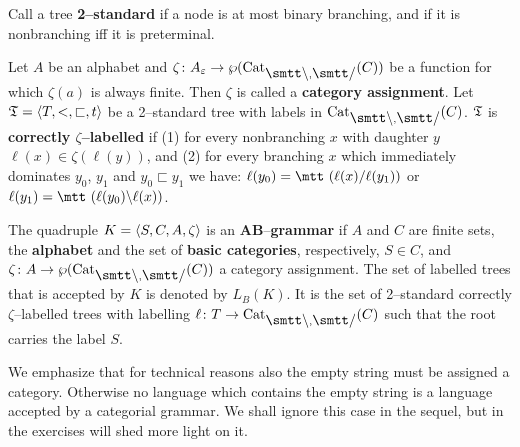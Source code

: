 Call a tree \textbf{2--standard} if a node is at most binary branching,
and if it is nonbranching iff it is preterminal.
\begin{defn}
Let $A$ be an alphabet and $\zeta \colon A_{\varepsilon} \pf
\wp(\Cat_{\mbox{\smtt\tb}, \mbox{\smtt\tf}}(C))$ be 
a function for which $\zeta(a)$ is always finite.  Then $\zeta$ 
is called a \textbf{category assignment}.
Let $\mathfrak{T} = \langle T, <, \sqsubset, t\rangle$ be a 2--standard tree
with labels in $\Cat_{\mbox{\smtt\tb}, \mbox{\smtt\tf}}(C)$.
$\mathfrak{T}$ is \textbf{correctly $\zeta$--labelled} %
if (1) for every nonbranching $x$ with daughter $y$
$\ell(x) \in \zeta(\ell(y))$, and (2) for every branching $x$
which immediately dominates $y_0$, $y_1$ and $y_0 \sqsubset y_1$
we have: $\ell(y_0) = \mbox{\mtt ($\ell(x)${\tf}$\ell(y_1)$)}$ or 
$\ell(y_1) = \mbox{\mtt ($\ell(y_0)${\tb}$\ell(x)$)}$.
\end{defn}
\begin{defn}
The quadruple $K = \langle S, C, A, \zeta\rangle$ is an 
\textbf{AB}--\textbf{grammar} if $A$ and $C$ are finite sets, the 
\textbf{alphabet} and the set of \textbf{basic categories},
respectively, $S \in C$, and $\zeta  \colon A \pf \wp(\Cat_{\mbox{\smtt\tb}, 
\mbox{\smtt\tf}}(C))$ a category assignment. The set of labelled 
trees that is accepted by $K$ is denoted by $L_B(K)$.
It is the set of 2--standard correctly $\zeta$--labelled trees
with labelling $\ell \colon T \pf \Cat_{\mbox{\smtt\tb}, 
\mbox{\smtt\tf}}(C)$ such that the root carries the label $S$.
\end{defn}
We emphasize that for technical reasons also the empty string
must be assigned a category. Otherwise no language which contains
the empty string is a language accepted by a categorial grammar.
We shall ignore this case in the sequel, but in the exercises
will shed more light on it.

